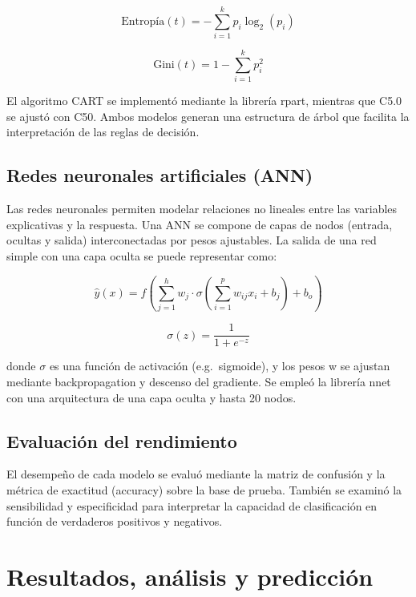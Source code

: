 \documentclass[Royal,times,sageh]{sagej}
\begin{document}

\[
\text{Entropía}(t) = - \sum_{i=1}^{k} p_i \log_2(p_i)
\]


\[
\text{Gini}(t) = 1 - \sum_{i=1}^{k} p_i^2
\]

El algoritmo CART se implementó mediante la librería rpart, mientras que
C5.0 se ajustó con C50. Ambos modelos generan una estructura de árbol
que facilita la interpretación de las reglas de decisión.

\subsection{Redes neuronales artificiales
(ANN)}\label{redes-neuronales-artificiales-ann}

Las redes neuronales permiten modelar relaciones no lineales entre las
variables explicativas y la respuesta. Una ANN se compone de capas de
nodos (entrada, ocultas y salida) interconectadas por pesos ajustables.
La salida de una red simple con una capa oculta se puede representar
como:


\[
\hat{y}(x) = f\left( \sum_{j=1}^{h} w_j \cdot \sigma\left( \sum_{i=1}^{p} w_{ij} x_i + b_j \right) + b_o \right)
\]


\[
\sigma(z) = \frac{1}{1 + e^{-z}}
\]

donde \(\sigma\) es una función de activación (e.g.~sigmoide), y los
pesos w se ajustan mediante backpropagation y descenso del gradiente. Se
empleó la librería nnet con una arquitectura de una capa oculta y hasta
20 nodos.

\subsection{Evaluación del
rendimiento}\label{evaluaciuxf3n-del-rendimiento}

El desempeño de cada modelo se evaluó mediante la matriz de confusión y
la métrica de exactitud (accuracy) sobre la base de prueba. También se
examinó la sensibilidad y especificidad para interpretar la capacidad de
clasificación en función de verdaderos positivos y negativos.

\section{Resultados, análisis y
predicción}\label{resultados-anuxe1lisis-y-predicciuxf3n}
\end{document}
